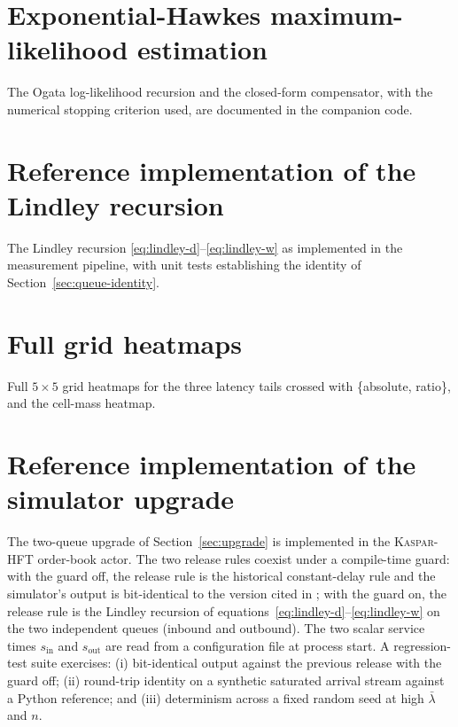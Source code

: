 \documentclass[11pt]{article}
\newcommand{\kasparhft}{\textsc{Kaspar-HFT}}
\begin{document}
\section{Exponential-Hawkes maximum-likelihood estimation}
\label{app:hawkes}

The Ogata log-likelihood recursion and the closed-form compensator, with the numerical stopping criterion used, are documented in the companion code.

\section{Reference implementation of the Lindley recursion}
\label{app:lindley}

The Lindley recursion \eqref{eq:lindley-d}--\eqref{eq:lindley-w} as implemented in the measurement pipeline, with unit tests establishing the identity of Section~\ref{sec:queue-identity}.

\section{Full grid heatmaps}
\label{app:grid}

Full $5 \times 5$ grid heatmaps for the three latency tails crossed with \{absolute, ratio\}, and the cell-mass heatmap.

\section{Reference implementation of the simulator upgrade}
\label{app:refimpl}

The two-queue upgrade of Section~\ref{sec:upgrade} is implemented in the \kasparhft{} order-book actor. The two release rules coexist under a compile-time guard: with the guard off, the release rule is the historical constant-delay rule and the simulator's output is bit-identical to the version cited in \citep{mayeski2026shadowpov}; with the guard on, the release rule is the Lindley recursion of equations~\eqref{eq:lindley-d}--\eqref{eq:lindley-w} on the two independent queues (inbound and outbound). The two scalar service times $s_{\mathrm{in}}$ and $s_{\mathrm{out}}$ are read from a configuration file at process start. A regression-test suite exercises: (i) bit-identical output against the previous release with the guard off; (ii) round-trip identity on a synthetic saturated arrival stream against a Python reference; and (iii) determinism across a fixed random seed at high $\bar\lambda$ and $n$.
\end{document}
